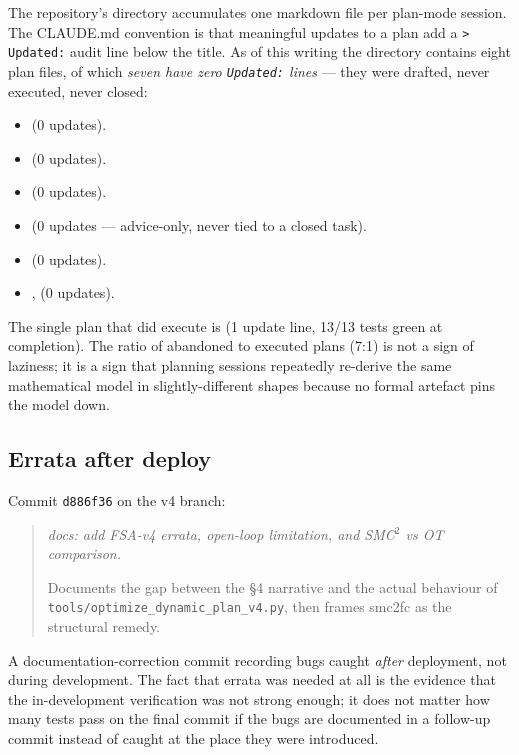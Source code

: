 \documentclass[11pt,a4paper]{article}
\begin{document}
The repository's  directory accumulates one
markdown file per plan-mode session. The CLAUDE.md convention is
that meaningful updates to a plan add a \verb|> Updated:| audit
line below the title. As of this writing the directory contains
eight plan files, of which \emph{seven have zero \texttt{Updated:}
lines} --- they were drafted, never executed, never closed:

\begin{itemize}\small
  \item {} (0 updates).
  \item {} (0 updates).
  \item {} (0 updates).
  \item {} (0 updates --- advice-only, never tied to a closed task).
  \item {} (0 updates).
  \item {},  (0 updates).
\end{itemize}

The single plan that did execute is
(1 update line, 13/13 tests green at completion). The ratio of
abandoned to executed plans (7:1) is not a sign of laziness; it is
a sign that planning sessions repeatedly re-derive the same
mathematical model in slightly-different shapes because no formal
artefact pins the model down.

\subsection{Errata after deploy}
\label{sec:errata}

Commit \texttt{d886f36} on the v4 branch:
\begin{quote}\itshape
docs: add FSA-v4 errata, open-loop limitation, and SMC$^2$ vs OT
comparison.

Documents the gap between the §4 narrative and the actual behaviour
of \texttt{tools/optimize\_dynamic\_plan\_v4.py}, then frames smc2fc
as the structural remedy.
\end{quote}
A documentation-correction commit recording bugs caught
\emph{after} deployment, not during development. The fact that
errata was needed at all is the evidence that the in-development
verification was not strong enough; it does not matter how many
tests pass on the final commit if the bugs are documented in a
follow-up commit instead of caught at the place they were
introduced.
\end{document}
